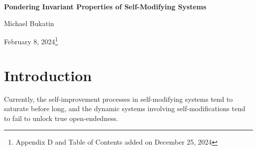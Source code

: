 \documentclass{article}
\begin{document}
\renewcommand{\abstractname}{\vspace{-\baselineskip}}

\renewcommand\contentsname{\vspace{-\baselineskip}}


\begin{center}

{\bf Pondering Invariant Properties of Self-Modifying Systems}
                                   



\vspace{0.1in}
Michael Bukatin


\vspace{0.085in}
February 8, 2024\footnote{Appendix D and Table of Contents added on December 25, 2024}
\end{center}



\begin{abstract}
The studies of invariant properties of self-modifying systems is a subject which is
quite neglected and which is likely to become fairly important in the near future.

It is likely that the ability to establish at least some approximately invariant
properties of self-modifying systems will be important for any hopes
to maintain any specific safety properties of the rapidly evolving AI ecosystem
and of the world containing this ecosystem.

One conjecture I would like to ponder is that it is likely to
be easier to maintain invariants in a situation where changes are
gradual and continuous (especially, if the self-modifying ecosystem
can control the rate at which the potentially most disruptive changes are phased in).

Let's ponder some possible technical directions which might allow us to make progress here.

\end{abstract}

\tableofcontents

\section{Introduction}

Currently, the self-improvement processes in self-modifying systems tend to saturate before long,
and the dynamic systems involving self-modifications tend to fail to unlock true open-endedness.
\end{document}
